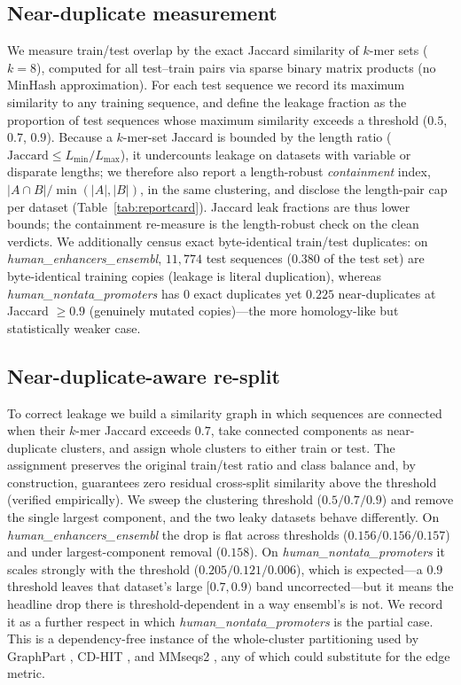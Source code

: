 \documentclass[webpdf,modern,large,namedate]{oup-authoring-template}%
\begin{document}
\subsection{Near-duplicate measurement}\label{sec:m-measure}
We measure train/test overlap by the exact Jaccard similarity of $k$-mer sets ($k=8$), computed for all test--train pairs via sparse binary matrix products (no MinHash approximation). For each test sequence we record its maximum similarity to any training sequence, and define the leakage fraction as the proportion of test sequences whose maximum similarity exceeds a threshold ($0.5$, $0.7$, $0.9$). Because a $k$-mer-set Jaccard is bounded by the length ratio ($\text{Jaccard}\le L_{\min}/L_{\max}$), it undercounts leakage on datasets with variable or disparate lengths; we therefore also report a length-robust \emph{containment} index, $|A\cap B|/\min(|A|,|B|)$, in the same clustering, and disclose the length-pair cap per dataset (Table~\ref{tab:reportcard}). Jaccard leak fractions are thus lower bounds; the containment re-measure is the length-robust check on the clean verdicts. We additionally census exact byte-identical train/test duplicates: on \textit{human\_enhancers\_ensembl}, $11{,}774$ test sequences ($0.380$ of the test set) are byte-identical training copies (leakage is literal duplication), whereas \textit{human\_nontata\_promoters} has $0$ exact duplicates yet $0.225$ near-duplicates at Jaccard $\ge0.9$ (genuinely mutated copies)---the more homology-like but statistically weaker case.

\subsection{Near-duplicate-aware re-split}
To correct leakage we build a similarity graph in which sequences are connected when their $k$-mer Jaccard exceeds $0.7$, take connected components as near-duplicate clusters, and assign whole clusters to either train or test. The assignment preserves the original train/test ratio and class balance and, by construction, guarantees zero residual cross-split similarity above the threshold (verified empirically). We sweep the clustering threshold ($0.5/0.7/0.9$) and remove the single largest component, and the two leaky datasets behave differently. On \textit{human\_enhancers\_ensembl} the drop is flat across thresholds ($0.156/0.156/0.157$) and under largest-component removal ($0.158$). On \textit{human\_nontata\_promoters} it scales strongly with the threshold ($0.205/0.121/0.006$), which is expected---a $0.9$ threshold leaves that dataset's large $[0.7,0.9)$ band uncorrected---but it means the headline drop there is threshold-dependent in a way ensembl's is not. We record it as a further respect in which \textit{human\_nontata\_promoters} is the partial case. This is a dependency-free instance of the whole-cluster partitioning used by GraphPart \citep{teufel2023graphpart}, CD-HIT \citep{li2006cdhit}, and MMseqs2 \citep{steinegger2017mmseqs2}, any of which could substitute for the edge metric.
\end{document}
